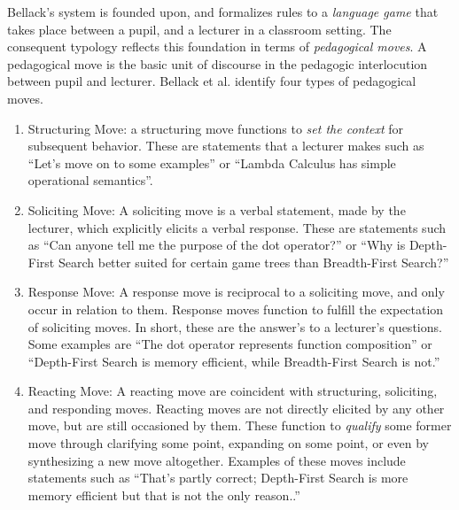 \documentclass[conference]{IEEEtran}
\begin{document}
Bellack's system is founded upon, and formalizes rules to a \emph{language
  game}\cite{wittgenstein2010philosophical} that takes place between a pupil,
and a lecturer in a classroom setting. The consequent typology reflects this
foundation in terms of \emph{pedagogical moves}. A pedagogical move is the basic
unit of discourse in the pedagogic interlocution between pupil and lecturer.
Bellack et al. identify four types of pedagogical moves.
%
\begin{enumerate}[P1.]

  \item \label{contrib:struct}
    Structuring Move: a structuring move functions to \emph{set the context} for
    subsequent behavior. These are statements that a lecturer makes such as
    ``Let's move on to some examples'' or ``Lambda Calculus has simple
    operational semantics''.
  
  \item \label{contrib:solicit}
    Soliciting Move: A soliciting move is a verbal statement, made by the
    lecturer, which explicitly elicits a verbal response. These are statements
    such as ``Can anyone tell me the purpose of the dot operator?'' or ``Why is
    Depth-First Search better suited for certain game trees than Breadth-First Search?''

   \item \label{contrib:response}
     Response Move: A response move is reciprocal to a soliciting move, and only
     occur in relation to them. Response moves function to fulfill the
     expectation of soliciting moves. In short, these are the answer's to a
     lecturer's questions. Some examples are ``The dot operator represents
     function composition'' or ``Depth-First Search is memory efficient, while
     Breadth-First Search is not.''

   \item \label{contrib:react}
     Reacting Move: A reacting move are coincident with structuring, soliciting,
     and responding moves. Reacting moves are not directly elicited by any other
     move, but are still occasioned by them. These function to \emph{qualify}
     some former move through clarifying some point, expanding on some point, or
     even by synthesizing a new move altogether. Examples of these moves include
     statements such as ``That's partly correct; Depth-First Search is more
     memory efficient but that is not the only reason..''

\end{enumerate}
\end{document}
